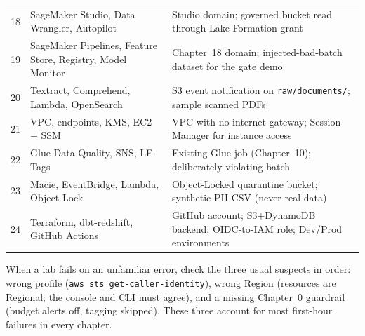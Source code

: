 \begin{center}
\begin{tabular}{@{}p{1.1cm}p{5.1cm}p{8.6cm}@{}}
18 & SageMaker Studio, Data Wrangler, Autopilot & Studio domain; governed bucket read through Lake Formation grant \\
19 & SageMaker Pipelines, Feature Store, Registry, Model Monitor & Chapter~18 domain; injected-bad-batch dataset for the gate demo \\
20 & Textract, Comprehend, Lambda, OpenSearch & S3 event notification on \texttt{raw/documents/}; sample scanned PDFs \\
21 & VPC, endpoints, KMS, EC2 + SSM & VPC with no internet gateway; Session Manager for instance access \\
22 & Glue Data Quality, SNS, LF-Tags & Existing Glue job (Chapter~10); deliberately violating batch \\
23 & Macie, EventBridge, Lambda, Object Lock & Object-Locked quarantine bucket; synthetic PII CSV (never real data) \\
24 & Terraform, dbt-redshift, GitHub Actions & GitHub account; S3+DynamoDB backend; OIDC-to-IAM role; Dev/Prod environments \\
\bottomrule
\end{tabular}
\end{center}

\begin{tipbox}
When a lab fails on an unfamiliar error, check the three usual suspects in order: wrong profile
(\texttt{aws sts get-caller-identity}), wrong Region (resources are Regional; the console and CLI
must agree), and a missing Chapter~0 guardrail (budget alerts off, tagging skipped). These three
account for most first-hour failures in every chapter.
\end{tipbox}
